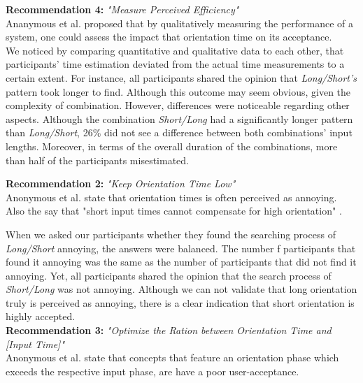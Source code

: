 \textbf{Recommendation 4:} \textit{"Measure Perceived Efficiency"} \\
Ananymous et al. proposed that by qualitatively measuring the performance of a system, one could assess the impact that orientation time on its acceptance. \\

We noticed by comparing quantitative and qualitative data to each other, that participants' time estimation deviated from the actual time measurements to a certain extent. For instance, all participants shared the opinion that \textit{Long/Short's} pattern took longer to find. Although this outcome may seem obvious, given the complexity of combination. However, differences were noticeable regarding other aspects. Although the combination \textit{Short/Long} had a significantly longer pattern than \textit{Long/Short}, 26\% did not see a difference between both combinations' input lengths. Moreover, in terms of the overall duration of the combinations, more than half of the participants misestimated.



\textbf{Recommendation 2:} \textit{"Keep Orientation Time Low"} \\
Anonymous et al. \cite{anonymous} state that orientation times is often perceived as annoying. Also the say that "short input times cannot compensate for high orientation" \cite{anonymous}.

When we asked our participants whether they found the searching process of \textit{Long/Short} annoying, the answers were balanced. The number f participants that found it annoying was the same as the number of participants that did not find it annoying. Yet, all participants shared the opinion that the search process of \textit{Short/Long} was not annoying. Although we can not validate that long orientation truly is perceived as annoying, there is a clear indication that short orientation is highly accepted. \\

\textbf{Recommendation 3:} \textit{"Optimize the Ration between Orientation Time and [Input Time]"} \\
Anonymous et al. \cite{anonymous} state that concepts that feature an orientation phase which exceeds the respective input phase, are have a poor user-acceptance. 

